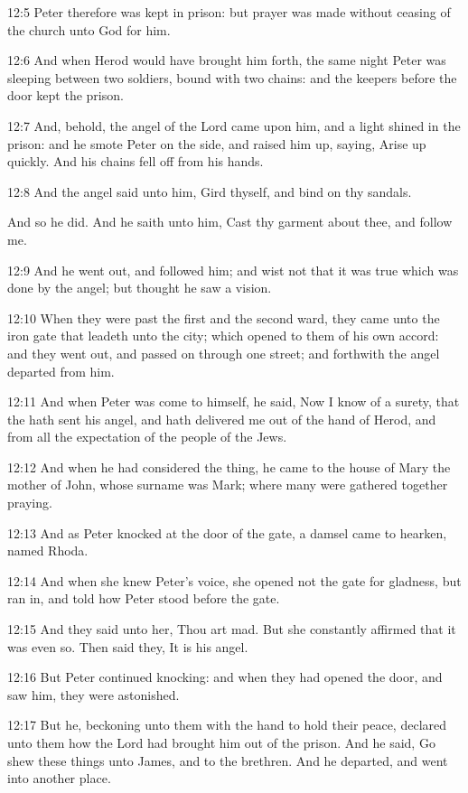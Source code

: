 12:5 Peter therefore was kept in prison: but prayer was made without ceasing of the church unto God for him.

12:6 And when Herod would have brought him forth, the same night Peter was sleeping between two soldiers, bound with two chains: and the keepers before the door kept the prison.

12:7 And, behold, the angel of the Lord came upon him, and a light shined in the prison: and he smote Peter on the side, and raised him up, saying, Arise up quickly. And his chains fell off from his hands.

12:8 And the angel said unto him, Gird thyself, and bind on thy sandals.

And so he did. And he saith unto him, Cast thy garment about thee, and follow me.

12:9 And he went out, and followed him; and wist not that it was true which was done by the angel; but thought he saw a vision.

12:10 When they were past the first and the second ward, they came unto the iron gate that leadeth unto the city; which opened to them of his own accord: and they went out, and passed on through one street; and forthwith the angel departed from him.

12:11 And when Peter was come to himself, he said, Now I know of a surety, that the \LORD hath sent his angel, and hath delivered me out of the hand of Herod, and from all the expectation of the people of the Jews.

12:12 And when he had considered the thing, he came to the house of Mary the mother of John, whose surname was Mark; where many were gathered together praying.

12:13 And as Peter knocked at the door of the gate, a damsel came to hearken, named Rhoda.

12:14 And when she knew Peter's voice, she opened not the gate for gladness, but ran in, and told how Peter stood before the gate.

12:15 And they said unto her, Thou art mad. But she constantly affirmed that it was even so. Then said they, It is his angel.

12:16 But Peter continued knocking: and when they had opened the door, and saw him, they were astonished.

12:17 But he, beckoning unto them with the hand to hold their peace, declared unto them how the Lord had brought him out of the prison. And he said, Go shew these things unto James, and to the brethren. And he departed, and went into another place.

